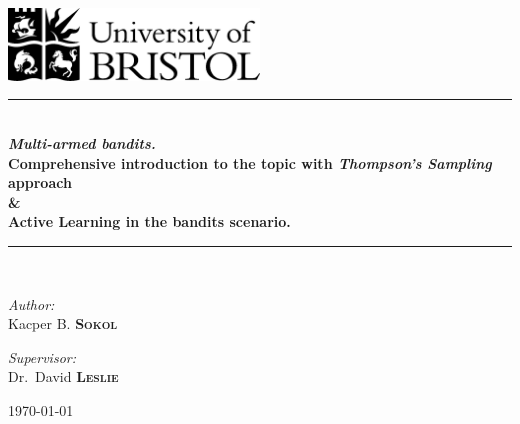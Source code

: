 \documentclass[12pt, a4paper, pdflatex, leqno]{report}
\newcommand{\HRule}{\rule{\linewidth}{0.5mm}}
\begin{document}
\begin{titlepage}
\begin{center}
\includegraphics[width=0.5\textwidth]{graphics/UOB-logo.png}~\\[4cm] %




\HRule \\[0.4cm]
{ \huge \bfseries \emph{Multi-armed bandits.}\\
	Comprehensive introduction to the topic with \emph{Thompson's Sampling} approach\\
  \&\\
  Active Learning in the bandits scenario.\\[0.4cm] }
\HRule \\[1.5cm]

\begin{minipage}{0.4\textwidth}
\begin{flushleft} \large
\emph{Author:}\\
Kacper B. \textsc{\textbf{Sokol}}
\end{flushleft}
\end{minipage}
\begin{minipage}{0.4\textwidth}
\begin{flushright} \large
\emph{Supervisor:} \\
Dr.~David \textsc{\textbf{Leslie}}
\end{flushright}
\end{minipage}

\vfill

{\large \today}
\end{center}
\end{titlepage}

\end{document}
